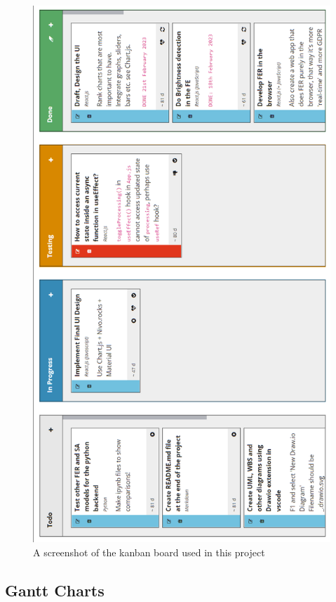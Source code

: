 \documentclass[12pt, a4paper]{article}
\begin{document}
\begin{appendices}
\begin{figure}[H]
    \centering
    \includegraphics[scale=0.57]{images/kanban.png}
    \caption{A screenshot of the kanban board used in this project}
    \label{fig:kanbanss}
\end{figure}

\subsection{Gantt Charts}
\label{appendix:ganttcharts}


\end{appendices}
\end{document}
